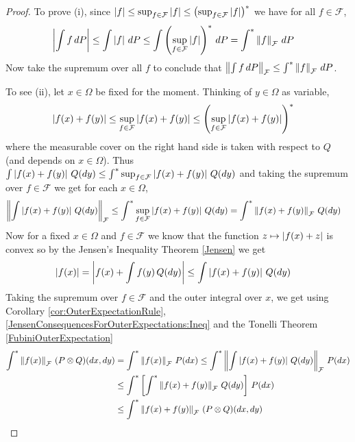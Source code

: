 \begin{proof}
To prove (i), since $\left \vert f \right \vert \leq \sup_{f \in \mathcal{F}} \left \vert f \right \vert \leq \left( \sup_{f \in \mathcal{F}} \left \vert f \right \vert \right)^*$ we have for all $f \in \mathcal{F}$,
\begin{align*}
\left \vert \int f \, dP \right \vert &\leq \int \left \vert f \right \vert \, dP \leq \int \left( \sup_{f \in \mathcal{F}} \left \vert f \right \vert \right)^* \, dP = \int^* \left \lVert f \right \rVert_{\mathcal{F}} \, dP
\end{align*}
Now take the supremum over all $f$ to conclude that $\left \lVert \int f \, dP \right \rVert_{\mathcal{F}} \leq \int^* \left \lVert f \right \rVert_{\mathcal{F}} \, dP$.

To see (ii), let $x \in \Omega$ be fixed for the moment.  Thinking of $y \in \Omega$ as variable,
\begin{align*}
\left \vert f(x) + f(y) \right \vert &\leq \sup_{f \in \mathcal{F}} \left \vert f(x) + f(y) \right \vert \leq \left(\sup_{f \in \mathcal{F}} \left \vert f(x) + f(y) \right \vert \right)^*
\end{align*}
where the measurable cover on the right hand side is taken with respect to $Q$ (and depends on $x \in \Omega$).  Thus $\int \left \vert f(x) + f(y) \right \vert \, Q(dy) \leq \int^* \sup_{f \in \mathcal{F}} \left \vert f(x) + f(y) \right \vert \, Q(dy)$ and taking the supremum over $f \in \mathcal{F}$ we get for each $x \in \Omega$,
\begin{align}\label{JensenConsequencesForOuterExpectations:Ineq}
\left \lVert \int \left \vert f(x) + f(y) \right \vert \, Q(dy) \right \rVert_{\mathcal{F}} &\leq \int^* \sup_{f \in \mathcal{F}} \left \vert f(x) + f(y) \right \vert \, Q(dy) = \int^* \left \lVert f(x)+f(y) \right \rVert_{\mathcal{F}} \, Q(dy)
\end{align}
Now for a fixed $x \in \Omega$ and $f \in \mathcal{F}$ we know that the function $z \mapsto \left \vert f(x) + z \right \vert$ is convex so by the Jensen's Inequality Theorem \ref{Jensen} we get 
\begin{align*}
\left \vert f(x) \right \vert &= \left \vert f(x) + \int f(y) \, Q(dy) \right \vert \leq \int \left \vert f(x) + f(y) \right \vert \, Q(dy) 
\end{align*}
Taking the supremum over $f \in \mathcal{F}$ and the outer integral over $x$, we get using Corollary \ref{cor:OuterExpectationRule}, \eqref{JensenConsequencesForOuterExpectations:Ineq} and the Tonelli Theorem \ref{FubiniOuterExpectation}
\begin{align*}
\int^* \left \lVert f(x) \right \rVert_{\mathcal{F}} \, (P\otimes Q)(dx, dy) &= \int^* \left \lVert f(x) \right \rVert_{\mathcal{F}} \, P(dx) \leq \int^* \left \lVert \int \left \vert f(x) + f(y) \right \vert \, Q(dy) \right \rVert_{\mathcal{F}}  \, P(dx) \\
&\leq \int^* \left[ \int^* \left \lVert f(x) + f(y) \right \rVert_{\mathcal{F}} \, Q(dy) \right ] \, P(dx) \\
&\leq \int^* \left \lVert f(x) + f(y) \right \rVert_{\mathcal{F}}  \, (P \otimes Q)(dx,dy)
\end{align*}


\end{proof}
